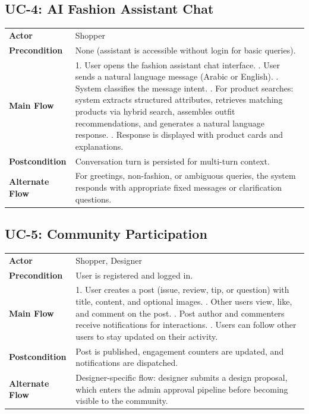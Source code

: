 \vspace{1em}

\subsection{UC-4: AI Fashion Assistant Chat}
\begin{tabular}{p{3.5cm} p{10cm}}
\toprule
\textbf{Actor} & Shopper \\
\textbf{Precondition} & None (assistant is accessible without login for basic queries). \\
\textbf{Main Flow} &
1. User opens the fashion assistant chat interface. \newline
2. User sends a natural language message (Arabic or English). \newline
3. System classifies the message intent. \newline
4. For product searches: system extracts structured attributes, retrieves matching products via hybrid search, assembles outfit recommendations, and generates a natural language response. \newline
5. Response is displayed with product cards and explanations. \\
\textbf{Postcondition} & Conversation turn is persisted for multi-turn context. \\
\textbf{Alternate Flow} & For greetings, non-fashion, or ambiguous queries, the system responds with appropriate fixed messages or clarification questions. \\
\bottomrule
\end{tabular}

\vspace{1em}

\subsection{UC-5: Community Participation}
\begin{tabular}{p{3.5cm} p{10cm}}
\toprule
\textbf{Actor} & Shopper, Designer \\
\textbf{Precondition} & User is registered and logged in. \\
\textbf{Main Flow} &
1. User creates a post (issue, review, tip, or question) with title, content, and optional images. \newline
2. Other users view, like, and comment on the post. \newline
3. Post author and commenters receive notifications for interactions. \newline
4. Users can follow other users to stay updated on their activity. \\
\textbf{Postcondition} & Post is published, engagement counters are updated, and notifications are dispatched. \\
\textbf{Alternate Flow} & Designer-specific flow: designer submits a design proposal, which enters the admin approval pipeline before becoming visible to the community. \\
\bottomrule
\end{tabular}

